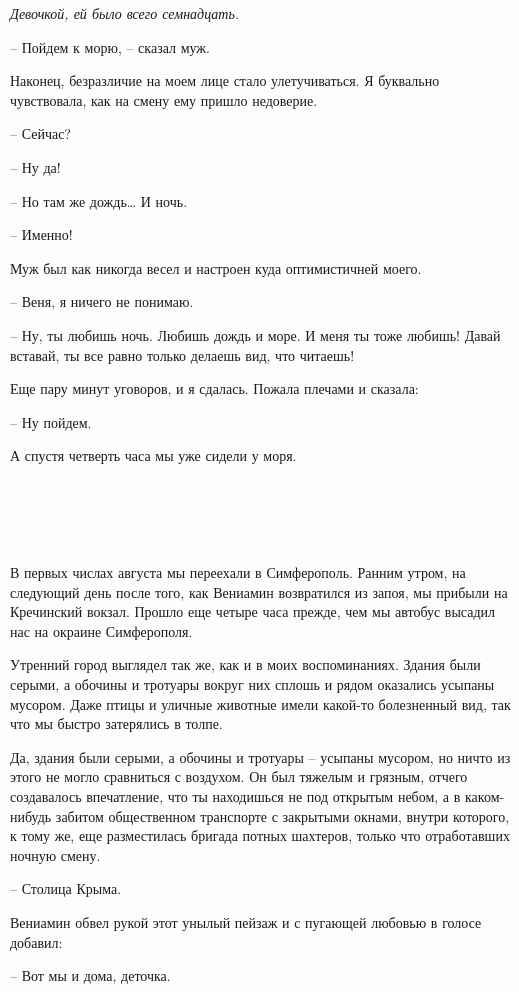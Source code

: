 \documentclass[
]{book}
\begin{document}
\emph{Девочкой, ей было всего семнадцать.}

-- Пойдем к морю, -- сказал муж.

Наконец, безразличие на моем лице стало улетучиваться. Я буквально чувствовала, как на смену ему пришло недоверие.

-- Сейчас?

-- Ну да!

-- Но там же дождь\ldots{} И ночь.

-- Именно!

Муж был как никогда весел и настроен куда оптимистичней моего.

-- Веня, я ничего не понимаю.

-- Ну, ты любишь ночь. Любишь дождь и море. И меня ты тоже любишь! Давай вставай, ты все равно только делаешь вид, что читаешь!

Еще пару минут уговоров, и я сдалась. Пожала плечами и сказала:

-- Ну пойдем.

А спустя четверть часа мы уже сидели у моря.

\hypertarget{chapter-65}{%
\chapter{~}\label{chapter-65}}

В первых числах августа мы переехали в Симферополь. Ранним утром, на следующий день после того, как Вениамин возвратился из запоя, мы прибыли на Кречинский вокзал. Прошло еще четыре часа прежде, чем мы автобус высадил нас на окраине Симферополя.

Утренний город выглядел так же, как и в моих воспоминаниях. Здания были серыми, а обочины и тротуары вокруг них сплошь и рядом оказались усыпаны мусором. Даже птицы и уличные животные имели какой-то болезненный вид, так что мы быстро затерялись в толпе.

Да, здания были серыми, а обочины и тротуары -- усыпаны мусором, но ничто из этого не могло сравниться с воздухом. Он был тяжелым и грязным, отчего создавалось впечатление, что ты находишься не под открытым небом, а в каком-нибудь забитом общественном транспорте с закрытыми окнами, внутри которого, к тому же, еще разместилась бригада потных шахтеров, только что отработавших ночную смену.

-- Столица Крыма.

Вениамин обвел рукой этот унылый пейзаж и с пугающей любовью в голосе добавил:

-- Вот мы и дома, деточка.
\end{document}
